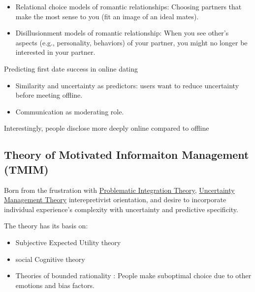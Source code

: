 \documentclass[
]{book}
\providecommand{\tightlist}{%
  \setlength{\itemsep}{0pt}\setlength{\parskip}{0pt}}
\begin{document}
\begin{itemize}
\tightlist
\item
  Relational choice models of romantic relationships: Choosing partners that make the most sense to you (fit an image of an ideal mates).\\
\item
  Disillusionment models of romantic relationship: When you see other's aspects (e.g., personality, behaviors) of your partner, you might no longer be interested in your partner.
\end{itemize}

Predicting first date success in online dating

\begin{itemize}
\tightlist
\item
  Similarity and uncertainty as predictors: users want to reduce uncertainty before meeting offline.\\
\item
  Communication as moderating role.
\end{itemize}

Interestingly, people disclose more deeply online compared to offline \citep{Tidwell_2002}

\hypertarget{theory-of-motivated-informaiton-management-tmim}{%
\subsection{Theory of Motivated Informaiton Management (TMIM)}\label{theory-of-motivated-informaiton-management-tmim}}

Born from the frustration with \protect\hyperlink{problematic-integration-theory}{Problematic Integration Theory}, \protect\hyperlink{uncertainty-management-theory}{Uncertainty Management Theory} interepretivist orientation, and desire to incorporate individual experience's complexity with uncertainty and predictive specificity.

The theory has its basis on:

\begin{itemize}
\tightlist
\item
  Subjective Expected Utility theory \citep{Fischhoff_1983}\\
\item
  social Cognitive theory \citep{Locke_1987}
\item
  Theories of bounded rationality \citep{Kahneman_2003}: People make suboptimal choice due to other emotions and bias factors.
\end{itemize}
\end{document}
